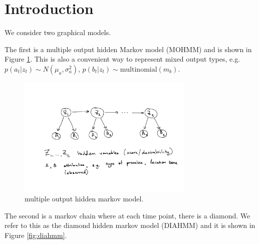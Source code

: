 \documentclass[a4paper,12pt]{article}
\begin{document}
%
%
%
%
%


\section{Introduction}

We consider two graphical models.

The first is a multiple output hidden Markov model (MOHMM) and is shown in Figure \ref{fig:mohmm}. 
This is also a convenient way to represent mixed output types, 
e.g. $p(a_t|z_t) \sim N(\mu_a, \sigma^2_a)$, 
$p(b_t|z_t) \sim \text{multinomial}(m_b)$.

\begin{figure}[!h]
\centering \includegraphics[width=0.75\textwidth]{figs/mohmm} 
\caption{multiple output hidden markov model. \label{fig:mohmm}}
\end{figure}


The second is a markov chain where at each time point, there is a diamond.
We refer to this as the diamond hidden markov model (DIAHMM) and it is shown in Figure \ref{fig:diahmm}.
\end{document}
